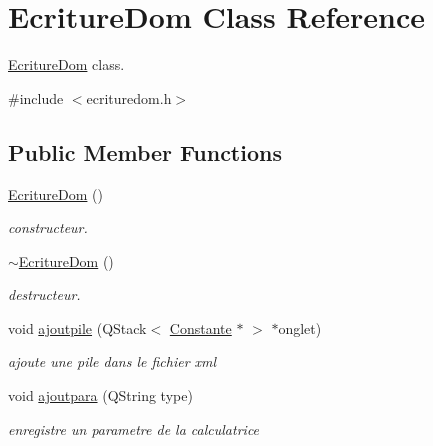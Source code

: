 \hypertarget{class_ecriture_dom}{\section{Ecriture\-Dom Class Reference}
\label{class_ecriture_dom}
}


\hyperlink{class_ecriture_dom}{Ecriture\-Dom} class.  




{\ttfamily \#include $<$ecrituredom.\-h$>$}

\subsection*{Public Member Functions}
\begin{DoxyCompactItemize}
\item 
\hypertarget{class_ecriture_dom_a4e355f1e7181196dc8adc4afc7b525ba}{\hyperlink{class_ecriture_dom_a4e355f1e7181196dc8adc4afc7b525ba}{Ecriture\-Dom} ()}\label{class_ecriture_dom_a4e355f1e7181196dc8adc4afc7b525ba}

\begin{DoxyCompactList}\small\item\em constructeur. \end{DoxyCompactList}\item 
\hypertarget{class_ecriture_dom_a3d4724b95f0d5397d73f911274ea058b}{\hyperlink{class_ecriture_dom_a3d4724b95f0d5397d73f911274ea058b}{$\sim$\-Ecriture\-Dom} ()}\label{class_ecriture_dom_a3d4724b95f0d5397d73f911274ea058b}

\begin{DoxyCompactList}\small\item\em destructeur. \end{DoxyCompactList}\item 
void \hyperlink{class_ecriture_dom_a63eab6fcf0c48a97e00bf7aece94c7c5}{ajoutpile} (Q\-Stack$<$ \hyperlink{class_constante}{Constante} $\ast$ $>$ $\ast$onglet)
\begin{DoxyCompactList}\small\item\em ajoute une pile dans le fichier xml \end{DoxyCompactList}\item 
void \hyperlink{class_ecriture_dom_ac2db3d9c329eab6fbd7afa7f629b6caf}{ajoutpara} (Q\-String type)
\begin{DoxyCompactList}\small\item\em enregistre un parametre de la calculatrice \end{DoxyCompactList}\end{DoxyCompactItemize}


